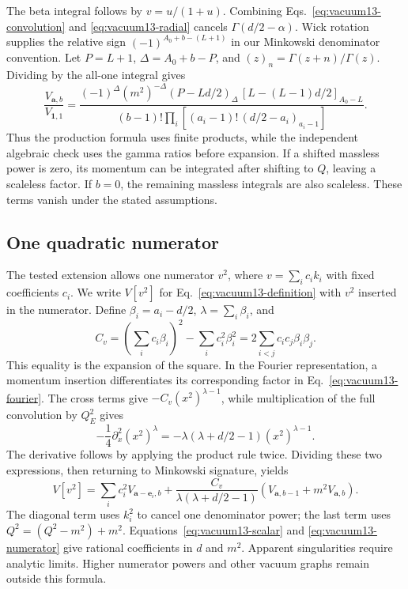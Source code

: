 The beta integral follows by $v=u/(1+u)$. Combining Eqs.~\eqref{eq:vacuum13-convolution} and \eqref{eq:vacuum13-radial} cancels $\Gamma(d/2-\alpha)$. Wick rotation supplies the relative sign $(-1)^{A_0+b-(L+1)}$ in our Minkowski denominator convention. Let $P=L+1$, $\Delta=A_0+b-P$, and $(z)_n=\Gamma(z+n)/\Gamma(z)$. Dividing by the all-one integral gives
\begin{equation}
 \frac{V_{\boldsymbol a,b}}{V_{\boldsymbol 1,1}}=
 \frac{(-1)^\Delta(m^2)^{-\Delta}
 (P-Ld/2)_\Delta\,[L-(L-1)d/2]_{A_0-L}}
 {(b-1)!\prod_i\left[(a_i-1)!\,(d/2-a_i)_{a_i-1}\right]}.
 \label{eq:vacuum13-scalar}
\end{equation}
Thus the production formula uses finite products, while the independent algebraic check uses the gamma ratios before expansion. If a shifted massless power is zero, its momentum can be integrated after shifting to $Q$, leaving a scaleless factor. If $b=0$, the remaining massless integrals are also scaleless. These terms vanish under the stated assumptions.

\subsection{One quadratic numerator}
The tested extension allows one numerator $v^2$, where $v=\sum_i c_i k_i$ with fixed coefficients $c_i$. We write $V[v^2]$ for Eq.~\eqref{eq:vacuum13-definition} with $v^2$ inserted in the numerator. Define $\beta_i=a_i-d/2$, $\lambda=\sum_i\beta_i$, and
\begin{equation}
 C_v=\left(\sum_i c_i\beta_i\right)^2-\sum_i c_i^2\beta_i^2
 =2\sum_{i<j}c_ic_j\beta_i\beta_j.
 \label{eq:vacuum13-cross}
\end{equation}
This equality is the expansion of the square. In the Fourier representation, a momentum insertion differentiates its corresponding factor in Eq.~\eqref{eq:vacuum13-fourier}. The cross terms give $-C_v(x^2)^{\lambda-1}$, while multiplication of the full convolution by $Q_E^2$ gives
\begin{equation}
 -\frac14\partial_x^2(x^2)^\lambda
 =-\lambda(\lambda+d/2-1)(x^2)^{\lambda-1}.
 \label{eq:vacuum13-laplacian}
\end{equation}
The derivative follows by applying the product rule twice. Dividing these two expressions, then returning to Minkowski signature, yields
\begin{equation}
 V[v^2]=\sum_i c_i^2V_{\boldsymbol a-\boldsymbol e_i,b}
 +\frac{C_v}{\lambda(\lambda+d/2-1)}
 \left(V_{\boldsymbol a,b-1}+m^2V_{\boldsymbol a,b}\right).
 \label{eq:vacuum13-numerator}
\end{equation}
The diagonal term uses $k_i^2$ to cancel one denominator power; the last term uses $Q^2=(Q^2-m^2)+m^2$. Equations~\eqref{eq:vacuum13-scalar} and \eqref{eq:vacuum13-numerator} give rational coefficients in $d$ and $m^2$. Apparent singularities require analytic limits. Higher numerator powers and other vacuum graphs remain outside this formula.

